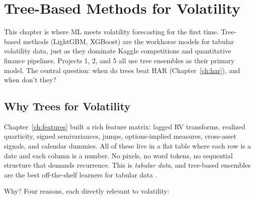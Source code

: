 
\chapter{Tree-Based Methods for Volatility}\label{ch:trees}

\begin{application}
This chapter is where ML meets volatility forecasting for the first time.
Tree-based methods (LightGBM, XGBoost) are the workhorse models for tabular
volatility data, just as they dominate Kaggle competitions and quantitative
finance pipelines.  Projects 1, 2, and 5 all use tree ensembles as their
primary model.  The central question: when do trees beat HAR
(Chapter~\ref{ch:har}), and when don't they?
\end{application}

\section{Why Trees for Volatility}\label{sec:trees:why}

Chapter~\ref{ch:features} built a rich feature matrix: lagged RV transforms,
realized quarticity, signed semivariances, jumps, options-implied measures,
cross-asset signals, and calendar dummies.  All of these live in a flat table
where each row is a date and each column is a number.  No pixels, no word
tokens, no sequential structure that demands recurrence.  This is \emph{tabular
data}, and tree-based ensembles are the best off-the-shelf learners for
tabular data \citep{GuKellyXiu2020}.

Why?  Four reasons, each directly relevant to volatility:

